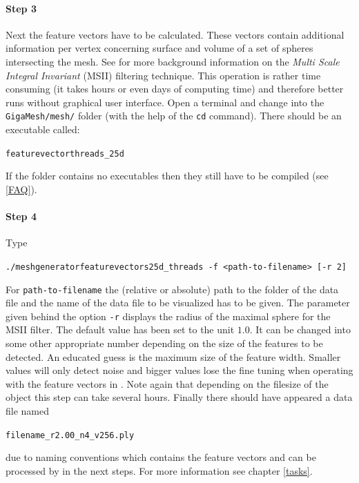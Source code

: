 \paragraph*{Step 3}
Next the feature vectors have to be calculated. These vectors contain additional information per vertex concerning surface and volume of a set of spheres intersecting the mesh. See \cite{Mara10c} for more background information on the {\em Multi Scale Integral Invariant }(MSII) filtering technique. This operation is rather time consuming (it takes hours or even days of computing time) and therefore better runs without graphical user interface. Open a terminal and change into the \texttt{GigaMesh/mesh/} folder (with the help of the \texttt{cd} command). There should be an executable called:
\begin{center} \texttt{featurevectorthreads\_25d} \end{center}
If the folder contains no executables then they still have to be compiled (see \ref{FAQ}).

\paragraph*{Step 4}
Type 
\begin{center} \texttt{./meshgeneratorfeaturevectors25d\_threads -f <path-to-filename> [-r 2]} \end{center}
For \texttt{path-to-filename} the (relative or absolute) path to the folder of the data file and the name of the data file to be visualized has to be given. The parameter given behind the option {\tt -r}  displays the radius of the maximal sphere for the MSII filter. The default value has been set to the unit $1.0$.  It  can be changed into some other appropriate number depending on the size of the features to be detected. An educated guess is the maximum size of the feature width. Smaller values will only detect noise and bigger values lose the fine tuning when operating with the feature vectors in \GigaMesh\!\!.
Note again that depending on the filesize of the object this step can take several hours. Finally there should have appeared a data file named  
\begin{center}
{\tt filename\_r2.00\_n4\_v256.ply} 
\end{center}
due to naming conventions which contains the feature vectors and can be processed by \GigaMesh in the next steps. For more information see chapter \ref{tasks}.

